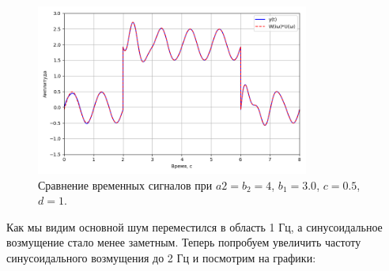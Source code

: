 \documentclass[a4paper]{article}
\begin{document}
\begin{figure}[H]
  \centering
  \includegraphics[width=0.8\textwidth]{src/task_1_2/4. time_comp_157_3_0.5.png}
  \caption{Сравнение временных сигналов при $a2 = b_2 = 4$, $b_1=3.0$, $c=0.5$, $d=1$.}
\end{figure}

Как мы видим основной шум переместился в область 1 Гц, а синусоидальное возмущение стало менее заметным. Теперь попробуем увеличить частоту синусоидального возмущения до 2 Гц и посмотрим на графики:
\end{document}
